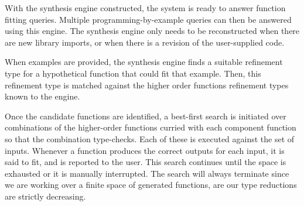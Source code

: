 With the synthesis engine constructed, the system is ready to answer function fitting queries. Multiple programming-by-example queries can then be answered using this engine. The synthesis engine only needs to be reconstructed when there are new library imports, or when there is a revision of the user-supplied code.

When examples are provided, the synthesis engine finds a suitable refinement type for a hypothetical function that could fit that example. Then, this refinement type is matched against the higher order functions refinement types known to the engine.

Once the candidate functions are identified, a best-first search is initiated over combinations of the higher-order functions curried with each component function so that the combination type-checks. Each of these is executed against the set of inputs. Whenever a function produces the correct outputs for each input, it is said to fit, and is reported to the user. This search continues until the space is exhausted or it is manually interrupted. The search will always terminate since we are working over a finite space of generated functions, are our type reductions are strictly decreasing.







